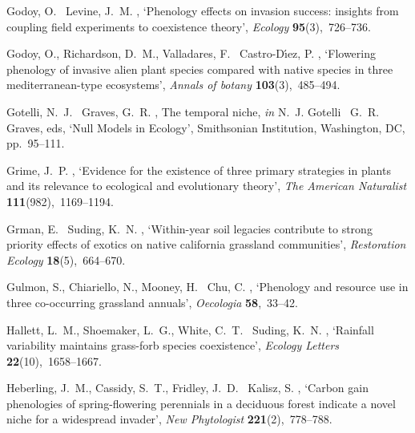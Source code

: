 \documentclass[11pt]{article}
\begin{document}
\begin{thebibliography}{xx}
Godoy, O. \harvardand\ Levine, J.~M.  \harvardyearright ,
  `Phenology effects on invasion success: insights from coupling field
  experiments to coexistence theory', {\em Ecology} {\bf 95}(3),~726--736.

Godoy, O., Richardson, D.~M., Valladares, F. \harvardand\ Castro-D{\'\i}ez, P.
  \harvardyearleft 2009\harvardyearright , `Flowering phenology of invasive
  alien plant species compared with native species in three mediterranean-type
  ecosystems', {\em Annals of botany} {\bf 103}(3),~485--494.

Gotelli, N.~J. \harvardand\ Graves, G.~R.  \harvardyearright , The temporal niche, {\em in} N.~J. Gotelli
  \harvardand\ G.~R. Graves, eds, `Null Models in Ecology', Smithsonian
  Institution, Washington, DC, pp.~95--111.

Grime, J.~P.  \harvardyearright , `Evidence for the
  existence of three primary strategies in plants and its relevance to
  ecological and evolutionary theory', {\em The American Naturalist} {\bf
  111}(982),~1169--1194.

Grman, E. \harvardand\ Suding, K.~N.  \harvardyearright ,
  `Within-year soil legacies contribute to strong priority effects of exotics
  on native california grassland communities', {\em Restoration Ecology} {\bf
  18}(5),~664--670.

Gulmon, S., Chiariello, N., Mooney, H. \harvardand\ Chu, C.  \harvardyearleft
  1983\harvardyearright , `Phenology and resource use in three co-occurring
  grassland annuals', {\em Oecologia} {\bf 58},~33--42.

Hallett, L.~M., Shoemaker, L.~G., White, C.~T. \harvardand\ Suding, K.~N.
  \harvardyearleft 2019\harvardyearright , `Rainfall variability maintains
  grass-forb species coexistence', {\em Ecology Letters} {\bf
  22}(10),~1658--1667.

Heberling, J.~M., Cassidy, S.~T., Fridley, J.~D. \harvardand\ Kalisz, S.
  \harvardyearright , `Carbon gain phenologies of
  spring-flowering perennials in a deciduous forest indicate a novel niche for
  a widespread invader', {\em New Phytologist} {\bf 221}(2),~778--788.


\end{thebibliography}
\end{document}
